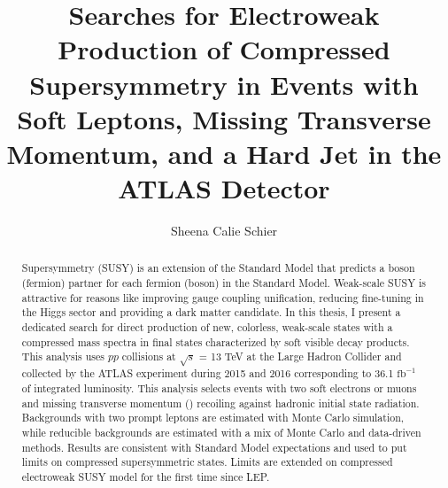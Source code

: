 \documentclass[11pt]{ucthesis}
\begin{document}

\title{Searches for Electroweak Production of Compressed Supersymmetry in Events with Soft Leptons, Missing Transverse Momentum, and a Hard Jet in the ATLAS Detector}
\author{Sheena Calie Schier}
\deanlinethree{}
\begin{frontmatter}

\maketitle
\copyrightpage

\tableofcontents
\listoffigures
\listoftables

\makeatletter
\newcommand{\rmnum}[1]{\romannumeral #1}
\newcommand{\Rmnum}[1]{\expandafter\@slowromancap\romannumeral #1@}
\makeatother

\begin{abstract}
Supersymmetry (SUSY) is an extension of the Standard Model that predicts a boson (fermion) partner for each fermion (boson) in the Standard Model. Weak-scale SUSY is attractive for reasons like improving gauge coupling unification, reducing fine-tuning in the Higgs sector and providing a dark matter candidate. In this thesis, I present a dedicated search for direct production of new, colorless, weak-scale states with a compressed mass spectra in final states characterized by soft visible decay products. This analysis uses $pp$ collisions at $\sqrt s$ = 13 TeV at the Large Hadron Collider and collected by the ATLAS experiment during 2015 and 2016 corresponding to 36.1 $\mathrm{fb}^{-1}$ of integrated luminosity. This analysis selects events with two soft electrons or muons and missing transverse momentum (\met{}) recoiling against hadronic initial state radiation. Backgrounds with two prompt leptons are estimated with Monte Carlo simulation, while reducible backgrounds are estimated with a mix of Monte Carlo and data-driven methods. Results are consistent with Standard Model expectations and used to put limits on compressed supersymmetric states.  Limits are extended on compressed electroweak SUSY model for the first time since LEP.

\end{abstract}


\end{frontmatter}
\end{document}
